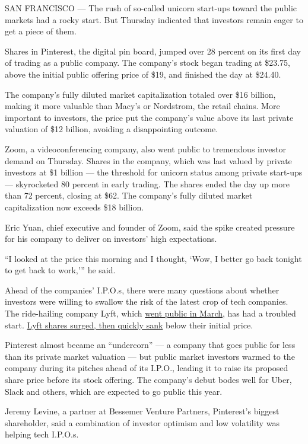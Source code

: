 SAN FRANCISCO --- The rush of so-called unicorn start-ups toward the
public markets had a rocky start. But Thursday indicated that investors
remain eager to get a piece of them.

Shares in Pinterest, the digital pin board, jumped over 28 percent on
its first day of trading as a public company. The company's stock began
trading at \$23.75, above the initial public offering price of \$19, and
finished the day at \$24.40.

The company's fully diluted market capitalization totaled over \$16
billion, making it more valuable than Macy's or Nordstrom, the retail
chains. More important to investors, the price put the company's value
above its last private valuation of \$12 billion, avoiding a
disappointing outcome.

Zoom, a videoconferencing company, also went public to tremendous
investor demand on Thursday. Shares in the company, which was last
valued by private investors at \$1 billion --- the threshold for unicorn
status among private start-ups --- skyrocketed 80 percent in early
trading. The shares ended the day up more than 72 percent, closing at
\$62. The company's fully diluted market capitalization now exceeds \$18
billion.

Eric Yuan, chief executive and founder of Zoom, said the spike created
pressure for his company to deliver on investors' high expectations.

``I looked at the price this morning and I thought, `Wow, I better go
back tonight to get back to work,''' he said.

Ahead of the companies' I.P.O.s, there were many questions about whether
investors were willing to swallow the risk of the latest crop of tech
companies. The ride-hailing company Lyft, which
\href{https://www.nytimes3xbfgragh.onion/2019/03/29/technology/lyft-stock-price.html}{went
public in March}, has had a troubled start.
\href{https://www.nytimes3xbfgragh.onion/2019/04/01/technology/lyft-stock.html}{Lyft
shares surged, then quickly sank} below their initial price.

Pinterest almost became an ``undercorn'' --- a company that goes public
for less than its private market valuation --- but public market
investors warmed to the company during its pitches ahead of its I.P.O.,
leading it to raise its proposed share price before its stock offering.
The company's debut bodes well for Uber, Slack and others, which are
expected to go public this year.

Jeremy Levine, a partner at Bessemer Venture Partners, Pinterest's
biggest shareholder, said a combination of investor optimism and low
volatility was helping tech I.P.O.s.

